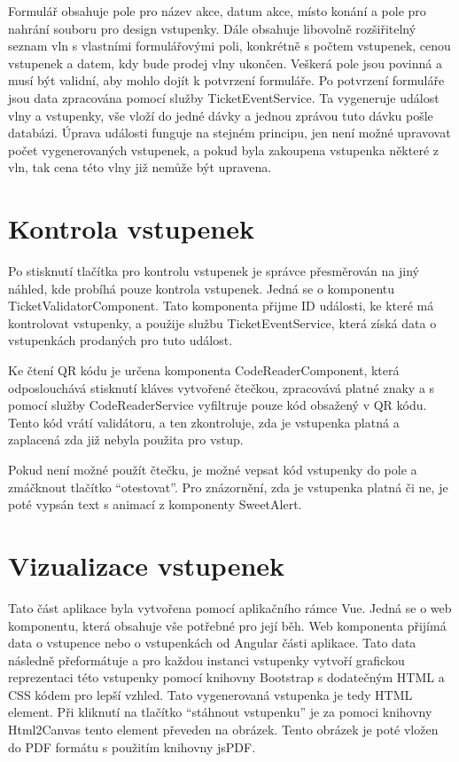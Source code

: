 Formulář obsahuje pole pro název akce, datum akce, místo konání a pole pro nahrání souboru pro design vstupenky. Dále obsahuje libovolně rozšiřitelný seznam vln s vlastními formulářovými poli, konkrétně s počtem vstupenek, cenou vstupenek a datem, kdy bude prodej vlny ukončen. Veškerá pole jsou povinná a musí být validní, aby mohlo dojít k potvrzení formuláře. Po potvrzení formuláře jsou data zpracována pomocí služby TicketEventService. Ta vygeneruje událost vlny a vstupenky, vše vloží do jedné dávky a jednou zprávou tuto dávku pošle databázi. Úprava události funguje na stejném principu, jen není možné upravovat počet vygenerovaných vstupenek, a pokud byla zakoupena vstupenka některé z vln, tak cena této vlny již nemůže být upravena.

    \section{Kontrola vstupenek}
Po stisknutí tlačítka pro kontrolu vstupenek je správce přesměrován na jiný náhled, kde probíhá pouze kontrola vstupenek. Jedná se o komponentu TicketValidatorComponent. Tato komponenta přijme ID události, ke které má kontrolovat vstupenky, a použije službu TicketEventService, která získá data o vstupenkách prodaných pro tuto událost. 

Ke čtení QR kódu je určena komponenta CodeReaderComponent, která odposlouchává stisknutí kláves vytvořené čtečkou, zpracovává platné znaky a s pomocí služby CodeReaderService vyfiltruje pouze kód obsažený v QR kódu. Tento kód vrátí validátoru, a ten zkontroluje, zda je vstupenka platná a zaplacená zda již nebyla použita pro vstup. 

Pokud není možné použít čtečku, je možné vepsat kód vstupenky do pole a zmáčknout tlačítko “otestovat”. Pro znázornění, zda je vstupenka platná či ne, je poté vypsán text s animací z komponenty SweetAlert.

    \section{Vizualizace vstupenek}
Tato část aplikace byla vytvořena pomocí aplikačního rámce Vue. Jedná se o web komponentu, která obsahuje vše potřebné pro její běh. Web komponenta přijímá data o vstupence nebo o vstupenkách od Angular části aplikace. Tato data následně přeformátuje a pro každou instanci vstupenky vytvoří grafickou reprezentaci této vstupenky pomocí knihovny Bootstrap s dodatečným HTML a CSS kódem pro lepší vzhled. Tato vygenerovaná vstupenka je tedy HTML element. Při kliknutí na tlačítko “stáhnout vstupenku” je za pomoci knihovny Html2Canvas tento element převeden na obrázek. Tento obrázek je poté vložen do PDF formátu s použitím knihovny jsPDF.
